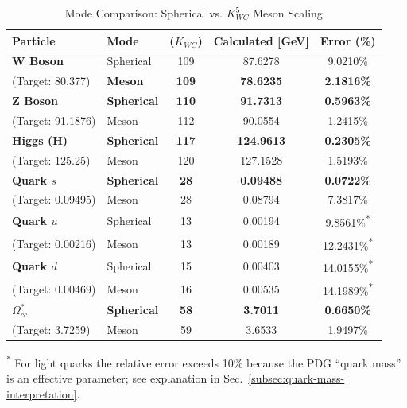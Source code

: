 \documentclass[10pt,a4paper]{article}
\begin{document}
\begin{table}[h!]
	\centering
	\caption{Mode Comparison: Spherical vs. $K_{WC}^5$ Meson Scaling}
	\label{tab:granular_comparison}
	\small
	\begin{tabular}{llccc}
		\toprule
		\textbf{Particle} & \textbf{Mode} & \textbf{($K_{WC}$)} & \textbf{Calculated [GeV]} & \textbf{Error (\%)} \\
		\midrule
		\textbf{W Boson} & Spherical & 109 & 87.6278 & 9.0210\% \\
		(Target: 80.377) & \textbf{Meson} & \textbf{109} & \textbf{78.6235} & \textbf{2.1816\%} \\
		\midrule
		\textbf{Z Boson} & \textbf{Spherical} & \textbf{110} & \textbf{91.7313} & \textbf{0.5963\%} \\
		(Target: 91.1876) & Meson & 112 & 90.0554 & 1.2415\% \\
		\midrule
		\textbf{Higgs (H)} & \textbf{Spherical} & \textbf{117} & \textbf{124.9613} & \textbf{0.2305\%} \\
		(Target: 125.25) & Meson & 120 & 127.1528 & 1.5193\% \\
		\midrule
		\textbf{Quark $s$} & \textbf{Spherical} & \textbf{28} & \textbf{0.09488} & \textbf{0.0722\%} \\
		(Target: 0.09495) & Meson & 28 & 0.08794 & 7.3817\% \\
		\midrule
		\textbf{Quark $u$} & Spherical & 13 & 0.00194 & 9.8561\%\textsuperscript{*} \\
		(Target: 0.00216) & Meson & 13 & 0.00189 & 12.2431\%\textsuperscript{*} \\
		\midrule
		\textbf{Quark $d$} & Spherical & 15 & 0.00403 & 14.0155\%\textsuperscript{*} \\
		(Target: 0.00469) & Meson  & 16 & 0.00535 & 14.1989\%\textsuperscript{*} \\
		\midrule
		\textbf{$\Omega_{cc}^*$} & \textbf{Spherical} & \textbf{58} & \textbf{3.7011} & \textbf{0.6650\%} \\
		(Target: 3.7259) & Meson & 59 & 3.6533 & 1.9497\% \\
		\bottomrule
	\end{tabular}
	
	\vspace{4pt}
	\raggedright\footnotesize
	\textsuperscript{*} For light quarks the relative error exceeds 10\% because 
	the PDG ``quark mass'' is an effective parameter; see explanation in 
	Sec.~\ref{subsec:quark-mass-interpretation}.
\end{table}
\end{document}
